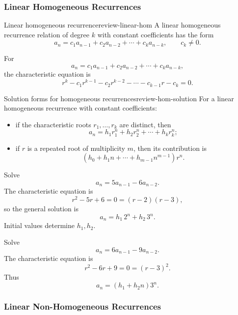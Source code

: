 \subsubsection{Linear Homogeneous Recurrences}

\begin{definition}{Linear homogeneous recurrence}{review-linear-hom}
A linear homogeneous recurrence relation of degree \(k\) with constant coefficients has the form
\[
a_n=c_1a_{n-1}+c_2a_{n-2}+\cdots+c_ka_{n-k},
\qquad c_k\neq 0.
\]
\end{definition}

\begin{keyformula}[title={Characteristic equation}]
For
\[
a_n=c_1a_{n-1}+c_2a_{n-2}+\cdots+c_ka_{n-k},
\]
the characteristic equation is
\[
r^k-c_1r^{k-1}-c_2r^{k-2}-\cdots-c_{k-1}r-c_k=0.
\]
\end{keyformula}

\begin{theorem}{Solution forms for homogeneous recurrences}{review-hom-solution}
For a linear homogeneous recurrence with constant coefficients:
\begin{itemize}[leftmargin=*]
    \item if the characteristic roots \(r_1,\dots,r_k\) are distinct, then
    \[
    a_n=h_1r_1^n+h_2r_2^n+\cdots+h_kr_k^n;
    \]
    \item if \(r\) is a repeated root of multiplicity \(m\), then its contribution is
    \[
    (h_0+h_1n+\cdots+h_{m-1}n^{m-1})r^n.
    \]
\end{itemize}
\end{theorem}

\begin{examplebox}[title={Distinct-root example}]
Solve
\[
a_n=5a_{n-1}-6a_{n-2}.
\]
The characteristic equation is
\[
r^2-5r+6=0=(r-2)(r-3),
\]
so the general solution is
\[
a_n=h_1\,2^n+h_2\,3^n.
\]
Initial values determine \(h_1,h_2\).
\end{examplebox}

\begin{examplebox}[title={Repeated-root example}]
Solve
\[
a_n=6a_{n-1}-9a_{n-2}.
\]
The characteristic equation is
\[
r^2-6r+9=0=(r-3)^2.
\]
Thus
\[
a_n=(h_1+h_2n)3^n.
\]
\end{examplebox}

\subsubsection{Linear Non-Homogeneous Recurrences}

